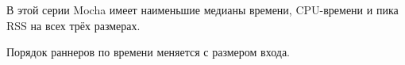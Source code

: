 \item В этой серии Mocha имеет наименьшие медианы времени, CPU-времени и пика RSS на всех трёх размерах.
\item Порядок раннеров по времени меняется с размером входа.